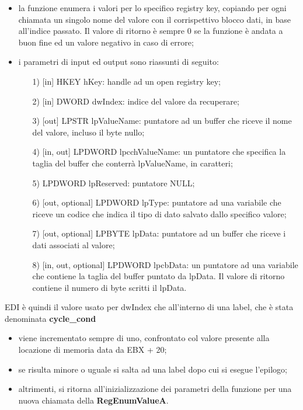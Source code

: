 \documentclass[12pt]{extarticle}
\begin{document}
\begin{itemize}
\item la funzione enumera i valori per lo specifico registry key, copiando per ogni chiamata un singolo nome del valore con il corrispettivo blocco dati, in base all'indice passato. Il valore di ritorno è sempre 0 se la funzione è andata a buon fine ed un valore negativo in caso di errore;
\item i parametri di input ed output sono riassunti di seguito:
\begin{itemize}
\item[1)] [in] \textsf{HKEY hKey}: handle ad un open registry key;
\item[2)] [in] \textsf{DWORD dwIndex}: indice del valore da recuperare;
\item[3)] [out] \textsf{LPSTR lpValueName}: puntatore ad un buffer che riceve il nome del valore, incluso il byte nullo;
\item[4)] [in, out] \textsf{LPDWORD lpcchValueName}: un puntatore che specifica la taglia del buffer che conterrà \textsf{lpValueName}, in caratteri;
\item[5)] \textsf{LPDWORD lpReserved}: puntatore NULL;
\item[6)] [out, optional] \textsf{LPDWORD lpType}: puntatore ad una variabile che riceve un codice che indica il tipo di dato salvato dallo specifico valore;
\item[7)] [out, optional] \textsf{LPBYTE lpData}: puntatore ad un buffer che riceve i dati associati al valore;
\item[8)] [in, out, optional] \textsf{LPDWORD lpcbData}: un puntatore ad una variabile che contiene la taglia del buffer puntato da \textsf{lpData}. Il valore di ritorno contiene il numero di byte scritti il lpData.
\end{itemize}
\end{itemize}
EDI è quindi il valore usato per \textsf{dwIndex} che all'interno di una label, che è stata denominata \textbf{cycle\_cond}
\begin{itemize}
\item viene incrementato sempre di uno, confrontato col valore presente alla locazione di memoria data da EBX + 20;
\item se risulta minore o uguale si salta ad una label dopo cui si esegue l'epilogo;
\item altrimenti, si ritorna all'inizializzazione dei parametri della funzione per una nuova chiamata della \textbf{RegEnumValueA}.
\end{itemize} 
\end{document}
